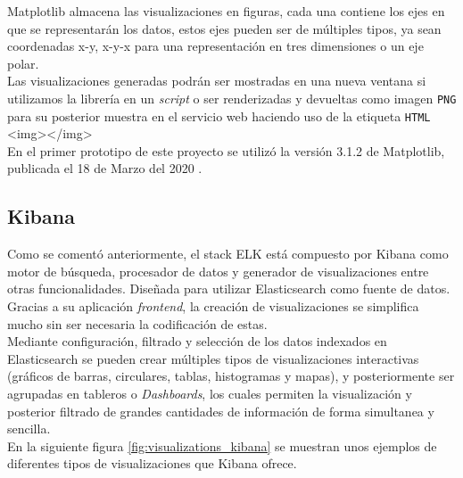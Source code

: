 \documentclass[a4paper, 12pt]{book}
\begin{document}
		Matplotlib almacena las visualizaciones en figuras, cada una contiene los ejes en que se representarán los datos, estos ejes pueden ser de múltiples tipos, ya sean coordenadas x-y, x-y-x para una representación en tres dimensiones o un eje polar.\\
		
		Las visualizaciones generadas podrán ser mostradas en una nueva ventana si utilizamos la librería en un \textit{script} o ser renderizadas y devueltas como imagen \texttt{PNG} para su posterior muestra en el servicio web haciendo uso de la etiqueta \texttt{HTML} <img></img>\\
		
		En el primer prototipo de este proyecto se utilizó la versión 3.1.2 de Matplotlib, publicada el 18 de Marzo del 2020 \cite{releases_matplotlib}.
		
	\subsection{Kibana}
	\label{subsec:kibana}
		Como se comentó anteriormente, el stack ELK está compuesto por Kibana \cite{kibana} como motor de búsqueda, procesador de datos y generador de visualizaciones entre otras funcionalidades. Diseñada para utilizar Elasticsearch como fuente de datos.\\
		
		Gracias a su aplicación \textit{frontend}, la creación de visualizaciones se simplifica mucho sin ser necesaria la codificación de estas. \\
		
		Mediante configuración, filtrado y selección de los datos indexados en Elasticsearch se pueden crear múltiples tipos de visualizaciones interactivas (gráficos de barras,  circulares, tablas, histogramas y mapas), y posteriormente ser agrupadas en tableros o \textit{Dashboards}, los cuales permiten la visualización y posterior filtrado de grandes cantidades de información de forma simultanea y sencilla.\\
		
		En la siguiente figura \ref{fig:visualizations_kibana} se muestran unos ejemplos de diferentes tipos de visualizaciones que Kibana ofrece.
		
\end{document}
